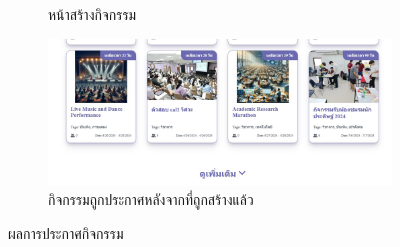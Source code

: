 \begin{figure}[h]
\begin{subfigure}[b]{0.4\linewidth}
    \caption{หน้าสร้างกิจกรรม}
  \end{subfigure}
  \hfill
  \begin{subfigure}[b]{0.4\linewidth}
    \includegraphics[width=\linewidth]{image/web/showCreate.jpg}
    \caption{กิจกรรมถูกประกาศหลังจากที่ถูกสร้างแล้ว}
  \end{subfigure}
  \caption{ผลการประกาศกิจกรรม}
  \label{fig:create}
\end{figure}

\FloatBarrier

